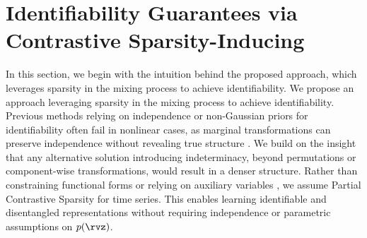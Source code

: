 \documentclass{article} %
\theoremstyle{plain}
\theoremstyle{definition}
\theoremstyle{remark}
\numberwithin{equation}{section}
\begin{document}

\vspace{-0.1cm}
\section{Identifiability Guarantees via Contrastive Sparsity-Inducing}\label{sec:proposedmethod}
\vspace{-0.1cm}
 In this section, we begin with the intuition behind the proposed approach, which leverages sparsity in the mixing process to achieve identifiability. We propose an approach leveraging sparsity in the mixing process to achieve identifiability. Previous methods relying on independence or non-Gaussian priors for identifiability often fail in nonlinear cases, as marginal transformations can preserve independence without revealing true structure \citep{HYVARINEN1999429, HyvarinenST19}. We build on the insight that any alternative solution introducing indeterminacy, beyond permutations or component-wise transformations, would result in a denser structure. Rather than constraining functional forms \citep{TalebJutten1999, ahuja_interventional_2023} or relying on auxiliary variables \citep{iVAEkhemakhem20a}, we assume Partial Contrastive Sparsity for time series. This enables learning identifiable and disentangled representations without requiring independence or parametric assumptions on $p(\rvz)$.
 
\end{document}
